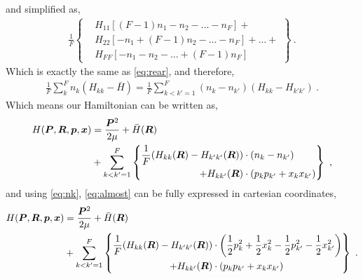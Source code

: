 and simplified as,
\begin{align}\label{eq:rear2}
\frac{1}{F} \left\{\begin{aligned}
& H_{11} \left[ (F-1) n_{1} - n_{2} - \dots - n_{F} \right] + \\
& H_{22} \left[ - n_{1} + (F-1) n_{2} - \dots - n_{F} \right] + \dots + \\
& H_{FF} \left[ - n_{1} - n_{2} - \dots + (F-1) n_{F} \right]
\end{aligned}\right\}~.
\end{align}
Which is exactly the same as \cref{eq:rear}, and therefore,
\begin{align}
\frac{1}{F}\sum\limits_{k}^{F} n_{k} (H_{kk} - \bar{H}) = \frac{1}{F} \sum\limits_{k<k'=1}^{F} (n_{k}-n_{k'})(H_{kk}-H_{k'k'})~.
\end{align}
Which means our Hamiltonian can be written as,
\begin{align}\label{eq:almost}
H(\bm{P}, \bm{R}, \bm{p}, \bm{x}) & =\frac{\bm{P}^{2}}{2\mu}+\bar{H}(\bm{R}) 
\nonumber\\
& +\sum\limits_{k<k'=1}^{F}
\left\{\begin{aligned}
\frac{1}{F} (H_{kk}(\bm{R})-H_{k'k'}(\bm{R}))&\cdot\left(n_{k}-n_{k'}\right)\\
+H_{kk'}(\bm{R})&\cdot(p_{k}p_{k'}+x_{k}x_{k'})
\end{aligned}\right\}~,
\end{align}
and using \cref{eq:nk}, \cref{eq:almost} can be fully expressed in cartesian coordinates,
\begin{align}
H(\bm{P}, \bm{R}, \bm{p}, \bm{x}) & =\frac{\bm{P}^{2}}{2\mu}+\bar{H}(\bm{R}) 
\nonumber\\
& +\sum\limits_{k<k'=1}^{F}
\left\{\begin{aligned}
\frac{1}{F} (H_{kk}(\bm{R})-H_{k'k'}(\bm{R}))&\cdot\left(
\frac{1}{2}p_{k}^{2}+\frac{1}{2}x_{k}^{2}-\frac{1}{2}p_{k'}^{2}-\frac{1}{2}x_{k'}^{2}\right)\\
+H_{kk'}(\bm{R})&\cdot(p_{k}p_{k'}+x_{k}x_{k'})
\end{aligned}\right\}~.
\end{align}
\begin{center}\end{center}
%